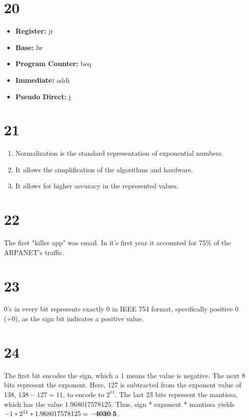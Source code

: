 \documentclass[a4paper,11pt]{article}
\begin{document}
\section*{20}
\begin{itemize}
  \item {\bf Register: } jr
  \item {\bf Base: } lw
  \item {\bf Program Counter: } beq
  \item {\bf Immediate: } addi
  \item {\bf Pseudo Direct:}  j
\end{itemize}


\section*{21}

\begin{enumerate}
  \item Normalization is the standard representation of exponential numbers.
  \item It allows the simplification of the algorithms and hardware.
  \item It allows for higher accuracy in the represented values.
\end{enumerate}


\section*{22}
The first "killer app" was email.  In it's first year it accounted for 75\% of the ARPANET's traffic.  


\section*{23}
0's in every bit represents exactly 0 in IEEE 754 format, specifically positive 0 (+0), as the sign bit indicates a positive value.


\section*{24}
The first bit encodes the sign, which a 1 means the value is negative.  The next 8 bits represent the exponent.  Here, 127 is subtracted from the exponent value of 138, $138 - 127 = 11$, to encode to $2^{11}$.  The last 23 bits represent the mantissa, which has the value 1.968017578125.  Thus, sign * exponent * mantissa yields $-1 * 2^{11} *  1.968017578125 = {\bf -4030.5}$.
\end{document}
